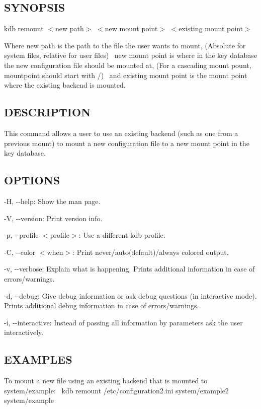 \subsection*{S\+Y\+N\+O\+P\+S\+IS}

{\ttfamily kdb remount $<$new path$>$ $<$new mount point$>$ $<$existing mount point$>$}

Where {\ttfamily new path} is the path to the file the user wants to mount, (Absolute for system files, relative for user files)~\newline
 {\ttfamily new mount point} is where in the key database the new configuration file should be mounted at, (For a cascading mount pount, {\ttfamily mountpoint} should start with {\ttfamily /})~\newline
 and {\ttfamily existing mount point} is the mount point where the existing backend is mounted.~\newline


\subsection*{D\+E\+S\+C\+R\+I\+P\+T\+I\+ON}

This command allows a user to use an existing backend (such as one from a previous mount) to mount a new configuration file to a new mount point in the key database.~\newline


\subsection*{O\+P\+T\+I\+O\+NS}


\begin{DoxyItemize}
\item {\ttfamily -\/H}, {\ttfamily -\/-\/help}\+: Show the man page.
\item {\ttfamily -\/V}, {\ttfamily -\/-\/version}\+: Print version info.
\item {\ttfamily -\/p}, {\ttfamily -\/-\/profile $<$profile$>$}\+: Use a different kdb profile.
\item {\ttfamily -\/C}, {\ttfamily -\/-\/color $<$when$>$}\+: Print never/auto(default)/always colored output.
\item {\ttfamily -\/v}, {\ttfamily -\/-\/verbose}\+: Explain what is happening. Prints additional information in case of errors/warnings.
\item {\ttfamily -\/d}, {\ttfamily -\/-\/debug}\+: Give debug information or ask debug questions (in interactive mode). Prints additional debug information in case of errors/warnings.
\item {\ttfamily -\/i}, {\ttfamily -\/-\/interactive}\+: Instead of passing all information by parameters ask the user interactively.
\end{DoxyItemize}

\subsection*{E\+X\+A\+M\+P\+L\+ES}

To mount a new file using an existing backend that is mounted to {\ttfamily system/example}\+:~\newline
 {\ttfamily kdb remount /etc/configuration2.ini system/example2 system/example}~\newline
 